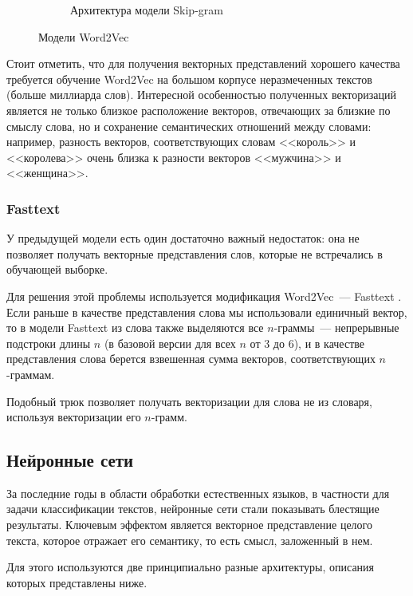 \documentclass[../diploma.tex]{subfiles}
\begin{document}
\begin{figure}[ht]
\begin{subfigure}{0.49\linewidth}
        	\caption{\label{second}Архитектура модели Skip-gram}
        	\label{fig:skip-gram}
        \end{subfigure}
     	\caption{Модели Word2Vec}
    \end{figure}

    Стоит отметить, что для получения векторных представлений хорошего качества требуется обучение Word2Vec на большом корпусе неразмеченных текстов 
    (больше миллиарда слов).
    Интересной особенностью полученных векторизаций является не только близкое расположение векторов, отвечающих за близкие по смыслу слова, 
    но и сохранение семантических отношений между словами: 
    например, разность векторов, соответствующих словам <<король>> и <<королева>> очень близка к разности векторов <<мужчина>> и <<женщина>>.   

	\subsubsection{Fasttext}  

    У предыдущей модели есть один достаточно важный недостаток: 
    она не позволяет получать векторные представления слов, которые не встречались в обучающей выборке.
    
    Для решения этой проблемы используется модификация Word2Vec~--- Fasttext \cite{article:fasttext}.
    Если раньше в качестве представления слова мы использовали единичный вектор, 
    то в модели Fasttext из слова также выделяются все $n$-граммы~--- непрерывные подстроки длины $n$ (в базовой версии для всех $n$ от $3$ до $6$), 
    и в качестве представления слова берется взвешенная сумма векторов, соответствующих $n$-граммам.

    Подобный трюк позволяет получать векторизации для слова не из словаря, используя векторизации его $n$-грамм.

    \subsection{Нейронные сети}

    \label{subsec:neural_nets}

    За последние годы в области обработки естественных языков, в частности для задачи классификации текстов, нейронные сети стали показывать блестящие результаты.
    Ключевым эффектом является векторное представление целого текста, которое отражает его семантику, то есть смысл, заложенный в нем.

    Для этого используются две принципиально разные архитектуры, описания которых представлены ниже.
\end{document}
